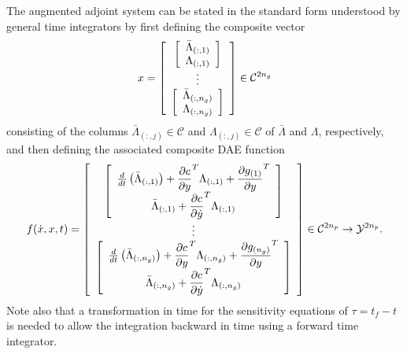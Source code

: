 \documentclass[pdf,ps2pdf,11pt]{SANDreport}
\begin{document}
The augmented adjoint system can be stated in the standard form understood by
general time integrators by first defining the composite vector
%
\begin{equation}
x =
{\bmat{c}
{\bmat{c} \bar{\Lambda}_{(:,1)} \\ \Lambda_{(:,1)} \emat} \\
\vdots \\
{\bmat{c} \bar{\Lambda}_{(:,n_g)} \\ \Lambda_{(:,n_g)} \emat} \\
\emat}
\in \mathcal{C}^{2 n_g}
\end{equation}
%
consisting of the columns $\bar{\Lambda}_{(:,j)}\in\mathcal{C}$ and
$\Lambda_{(:,j)}\in\mathcal{C}$ of $\bar{\Lambda}$ and $\Lambda$,
respectively, and then defining the associated composite DAE function
%
\begin{equation}
f(\dot{x},x,t) =
{\bmat{c}
%
{\bmat{c}
\frac{d}{dt}\left( \bar{\Lambda}_{(:,1)} \right)
+ \Jac{c}{y}^T \Lambda_{(:,1)} + \Jac{g_{(1)}}{y}^T
\\
\bar{\Lambda}_{(:,1)} + \Jac{c}{\dot{y}}^T \Lambda_{(:,1)}
\emat} \\
%
\vdots \\
%
{\bmat{c}
\frac{d}{dt}\left( \bar{\Lambda}_{(:,n_g)} \right)
+ \Jac{c}{y}^T \Lambda_{(:,n_g)} + \Jac{g_{(n_g)}}{y}^T
\\
\bar{\Lambda}_{(:,n_g)} + \Jac{c}{\dot{y}}^T \Lambda_{(:,n_g)}
\emat} \\
%
\emat}
\in \mathcal{C}^{2 n_p} \rightarrow \mathcal{Y}^{2 n_p}.
\label{rythmos:eqn:aug-adj-sens-daes}
\end{equation}
%
Note also that a transformation in time for the sensitivity equations of $\tau
= t_f - t$ is needed to allow the integration backward in time using a forward
time integrator.
\end{document}

